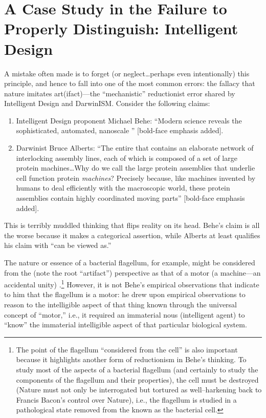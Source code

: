 \section[A Case Study]{A Case Study in the Failure to Properly Distinguish: Intelligent Design}

A mistake often made is to forget (or neglect\ldots perhaps even intentionally) this principle, and hence to fall into one of the most common errors: the fallacy that nature imitates art(ifact)---the ``mechanistic'' reductionist error shared by Intelligent Design and DarwinISM. Consider the following claims:

\begin{enumerate}
\item {} Intelligent Design proponent Michael Behe: ``Modern science reveals the  sophisticated, automated, nanoscale '' \citep{beheinterview} [bold-face emphasis added].
\item {} Darwinist Bruce Alberts: ``The entire  that contains an elaborate network of interlocking assembly lines, each of which is composed of a set of large protein machines\ldots Why do we call the large protein assemblies that underlie cell function protein \emph{machines}? Precisely because, like machines invented by humans to deal efficiently with the macroscopic world, these protein assemblies contain highly coordinated moving parts'' \citep[][p.~291]{balberts} [bold-face emphasis added].
\end{enumerate}

This is terribly muddled thinking that flips reality on its head.  Behe's claim is all the worse because it makes a categorical assertion, while Alberts at least qualifies his claim with ``can be viewed as.''

The nature or essence of a bacterial flagellum, for example, might be considered from the  (note the root ``artifact'') perspective as that of a motor (a machine---an accidental unity) .\footnote{The point of the flagellum ``considered  from the cell'' is also important because it highlights another form of reductionism in Behe's thinking. To study most of the aspects of a bacterial flagellum (and certainly to study the components of the flagellum and their properties), the cell must be destroyed (Nature must not only be interrogated but tortured as well--harkening back to Francis Bacon's  control over Nature), i.e., the flagellum is studied in a pathological state removed from the  known as the bacterial cell.} However, it is not Behe's empirical observations that indicate to him that the flagellum is a motor: he drew upon empirical observations to reason to the intelligible aspect of that thing known through the universal concept of ``motor,'' i.e., it required an immaterial nous (intelligent agent) to ``know'' the immaterial intelligible aspect of that particular biological system.

